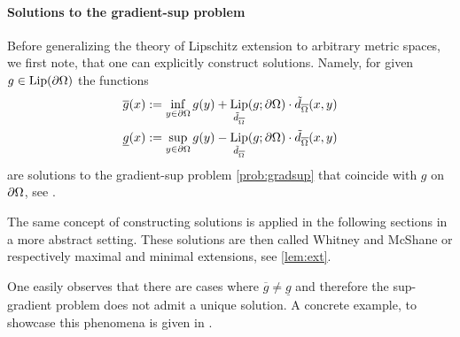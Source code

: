 \paragraph{Solutions to the gradient-sup problem}
%
Before generalizing the theory of Lipschitz extension to arbitrary metric spaces, we first note, that one can explicitly construct solutions. Namely, for given $g\in\operatorname*{Lip}(\partial\Omega)$ the functions 
%
\begin{align}\label{eq:JenSol}
\begin{aligned}
\overline{g}(x) &:= \inf_{y\in\partial\domain} g(y) + 
\Lip_{\tilde{d}_{\overline{\domain}}}(g; \partial\domain)\cdot \tilde{d}_{\overline{\domain}}(x,y)\\
%
\underline{g}(x) &:= \sup_{y\in\partial\domain} g(y) - 
\Lip_{\tilde{d}_{\overline{\domain}}}(g; \partial\domain)\cdot \tilde{d}_{\overline{\domain}}(x,y)
\end{aligned}
\end{align}
%
are solutions to the gradient-sup problem \cref{prob:gradsup} that coincide with $g$ on $\partial\Omega$, see \cite[Th. 1.8]{jensen1993uniqueness}.
%
\begin{remark}{}{}
The same concept of constructing solutions is applied in the following sections in a more abstract setting. 
These solutions are then called Whitney and McShane or respectively maximal and minimal extensions, see 
\cref{lem:ext}.
\end{remark}
%
One easily observes that there are cases where $\overline{g}\neq \underline{g}$ and therefore the sup-gradient 
problem does not admit a unique solution. A concrete example, to showcase this phenomena is given  
in \cite[p. 53]{jensen1993uniqueness}.
%
%
